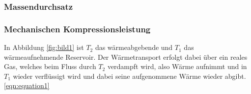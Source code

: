 \subsubsection {Massendurchsatz}
\label{sec:massendurchsatz}
\subsubsection {Mechanischen Kompressionsleistung} 
\label{sec:kompressorleistung}


In Abbildung \ref{fig:bild1} ist $T_2$ das wärmeabgebende und $T_1$ das wärmeaufnehmende Reservoir. Der Wärmetransport erfolgt dabei über ein reales Gas, welches beim Fluss durch $T_2$ verdampft wird, also Wärme aufnimmt
und in $T_1$ wieder verflüssigt wird und dabei seine aufgenommene Wärme wieder abgibt. \eqref{eqn:equation1}







\cite{Anleitung}
